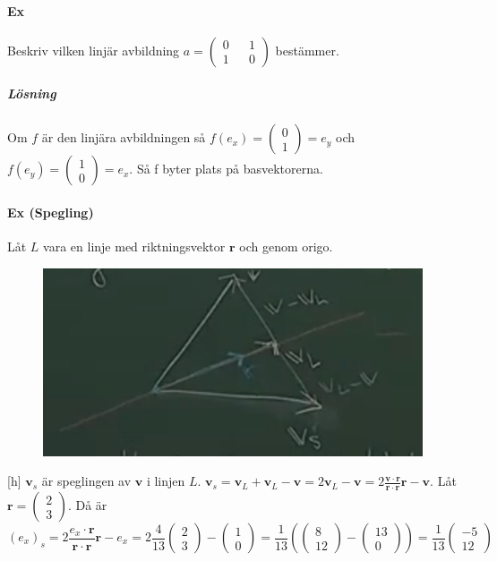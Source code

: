 \paragraph{Ex} Beskriv vilken linjär avbildning $a=\begin{pmatrix}0&&1\\1&&0\end{pmatrix}$ bestämmer.
\subparagraph{Lösning} Om $f$ är den linjära avbildningen så $f(e_{x})=\begin{pmatrix}0\\1\end{pmatrix}=e_{y}$
och $f(e_{y})=\begin{pmatrix}1\\0\end{pmatrix}=e_{x}$.
Så f byter  plats på basvektorerna.

\paragraph{Ex (Spegling)} Låt $L$ vara en linje med riktningsvektor $\bm{r}$ och genom origo.
\begin{figure}
    \includegraphics[scale=0.35]{imgs/img03.png}
\end{figure}[h]
$\bm{v}_{s}$ är speglingen av $\bm{v}$ i linjen $L$.
$\bm{v}_{s}=\bm{v}_{L}+\bm{v}_{L}-\bm{v}=2\bm{v}_{L}-\bm{v}=2\frac{\bm{v}\cdot \bm{r}}{\bm{r}\cdot \bm{r}}\bm{r}-\bm{v}$.
Låt $\bm{r}=\begin{pmatrix}2\\3\end{pmatrix}$.
Då är 
\begin{equation*}
    (e_{x})_{s}=2\frac{e_{x}\cdot \bm{r}}{\bm{r}\cdot \bm{r}}\bm{r}-e_{x}=2\frac{4}{13}\begin{pmatrix}2\\3\end{pmatrix}-\begin{pmatrix}1\\0\end{pmatrix}=
    \frac{1}{13}(\begin{pmatrix}8\\12\end{pmatrix}-\begin{pmatrix}13\\0\end{pmatrix})=\frac{1}{13}\begin{pmatrix}-5\\12\end{pmatrix}
\end{equation*}
